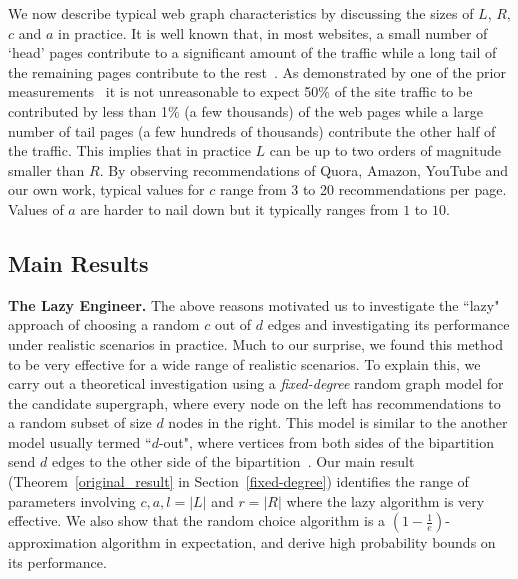 We now describe typical web graph characteristics by discussing the sizes of $L$, $R$, $c$ and $a$ in practice. It is well known
that, in most websites,  a small number of `head' pages contribute to a
significant amount of the traffic while a long tail of the remaining
pages contribute to the rest~\cite{HubermanAdamic1999, DuDemmerBrewer2006}. As
demonstrated by one of the prior measurements~\cite{KumarNorrisSun2009}
it is not unreasonable to expect 50\% of the site traffic to be
contributed by less than 1\% (a few thousands) of the web pages while a
large number of tail pages (a few hundreds of thousands) contribute
the other half of the traffic. This implies that in practice $L$ can
be up to two orders of magnitude smaller than $R$.  By observing
recommendations of Quora, Amazon, YouTube and our own work, 
typical values for $c$ range from 3 to 20 recommendations per page. Values of $a$ are harder to nail down but it typically ranges from $1$ to $10$. \vs


\subsection{Main Results}

{\bf The Lazy Engineer.} The above reasons motivated us to
investigate the ``lazy" approach of choosing a random $c$ out of $d$ edges
and investigating its performance under realistic scenarios in practice.  
Much to our surprise, we found this method to be very effective for a wide range of realistic scenarios. To explain this, we carry out a theoretical investigation using
a {\em fixed-degree} random graph model for the candidate supergraph, where every
node on the left has recommendations to a random subset of size $d$ nodes in the right. This model is similar to the another model usually termed ``$d$-out", where vertices from both sides of the bipartition send $d$
edges to the other side of the bipartition~\cite{FriezePittel2004}. Our main result
(Theorem~\ref{original_result} in Section~\ref{fixed-degree}) identifies the range of parameters involving $c,a,l=|L|$ and $r =|R|$ where the lazy algorithm is very effective. We also show that the random choice algorithm is a $(1-\frac1e)$- approximation algorithm in expectation, and derive high probability bounds on its performance.\vs


